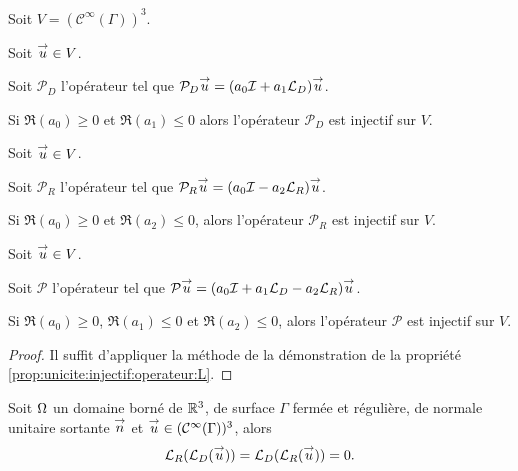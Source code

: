   Soit \(V=(\mathcal{C}^\infty(\Gamma))^3\).
  \begin{prop}
    \label{prop:unicite:injectif:operateur:LD}
    Soit \({\overset{\rightarrow}{u}} \in V\).

    Soit \(\mathcal{P}_D\) l'opérateur tel que \(\mathcal{P}_D{\overset{\rightarrow}{u}} = (a_0{\mathcal{I}} + a_1 {\mathcal{L}_D}){\overset{\rightarrow}{u}}\).

    Si \(\Re(a_0)\ge 0\) et \(\Re(a_1)\le 0\) alors l'opérateur \(\mathcal{P}_D\) est injectif sur \(V\).
  \end{prop}
  \begin{prop}
    \label{prop:unicite:injectif:operateur:LR}
    Soit \({\overset{\rightarrow}{u}} \in V\).

    Soit \(\mathcal{P}_R\) l'opérateur tel que \(\mathcal{P}_R{\overset{\rightarrow}{u}} = (a_0{\mathcal{I}} - a_2 {\mathcal{L}_R}){\overset{\rightarrow}{u}}\).

    Si \(\Re(a_0)\ge 0\) et \(\Re(a_2)\le 0\), alors l'opérateur \(\mathcal{P}_R\) est injectif sur \(V\).
  \end{prop}
  \begin{prop}
    \label{prop:unicite:injectif:operateur:LD-LR}
    Soit \({\overset{\rightarrow}{u}} \in V\).
    
    Soit \(\mathcal{P}\) l'opérateur tel que \(\mathcal{P}{\overset{\rightarrow}{u}} = (a_0{\mathcal{I}} + a_1 {\mathcal{L}_D} - a_2{\mathcal{L}_R}){\overset{\rightarrow}{u}}\).

    Si \(\Re(a_0)\ge 0\), \(\Re(a_1)\le 0\) et \(\Re(a_2)\le 0\), alors l'opérateur \(\mathcal{P}\) est injectif sur \(V\).
  \end{prop}
  \begin{proof}
    Il suffit d'appliquer la méthode de la démonstration de la propriété \ref{prop:unicite:injectif:operateur:L}.
  \end{proof}

  \begin{prop}
    Soit \(\Omega\) un domaine borné de \(\mathbb R^3\), de surface \(\Gamma\) fermée et régulière, de normale unitaire sortante \({\overset{\rightarrow}{n}}\) et \({\overset{\rightarrow}{u}} \in (\mathcal{C}^\infty(\Gamma))^3\), alors
    \begin{equation*}
        {\mathcal{L}_R}({\mathcal{L}_D}({\overset{\rightarrow}{u}})) = {\mathcal{L}_D}({\mathcal{L}_R}({\overset{\rightarrow}{u}})) = 0.
    \end{equation*}
  \end{prop}

